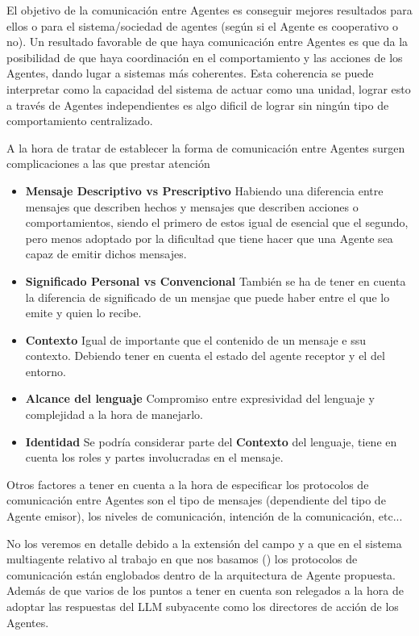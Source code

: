 El objetivo de la comunicación entre Agentes es conseguir mejores resultados para ellos o para el sistema/sociedad de agentes (según si el Agente es cooperativo o no). Un resultado favorable de que haya comunicación entre Agentes es que da la posibilidad de que haya coordinación en el comportamiento y las acciones de los Agentes, dando lugar a sistemas más coherentes. Esta coherencia se puede interpretar como la capacidad del sistema de actuar como una unidad, lograr esto a través de Agentes independientes es algo dificil de lograr sin ningún tipo de comportamiento centralizado. 

A la hora de tratar de establecer la forma de comunicación entre Agentes surgen complicaciones a las que prestar atención

\begin{itemize}
	\item\textbf{Mensaje Descriptivo vs Prescriptivo} Habiendo una diferencia entre mensajes que describen hechos y mensajes que describen acciones o comportamientos, siendo el primero de estos igual de esencial que el segundo, pero menos adoptado por la dificultad que tiene hacer que una Agente sea capaz de emitir dichos mensajes.
	\item\textbf{Significado Personal vs Convencional} También se ha de tener en cuenta la diferencia de significado de un mensjae que puede haber entre el que lo emite y quien lo recibe.
	\item\textbf{Contexto} Igual de importante que el contenido de un mensaje e ssu contexto. Debiendo tener en cuenta el estado del agente receptor y el del entorno.
	\item\textbf{Alcance del lenguaje} Compromiso entre expresividad del lenguaje y complejidad a la hora de manejarlo.
	\item\textbf{Identidad} Se podría considerar parte del \textbf{Contexto} del lenguaje, tiene en cuenta los roles y partes involucradas en el mensaje.
\end{itemize}

Otros factores a tener en cuenta a la hora de especificar los protocolos de comunicación entre Agentes son el tipo de mensajes (dependiente del tipo de Agente emisor), los niveles de comunicación, intención de la comunicación, etc... 

No los veremos en detalle debido a la extensión del campo y a que en el sistema multiagente relativo al trabajo en que nos basamos (\cite{park2023generative}) los protocolos de comunicación están englobados dentro de la arquitectura de Agente propuesta. Además de que varios de los puntos a tener en cuenta son relegados a la hora de adoptar las respuestas del LLM subyacente como los directores de acción de los Agentes.

